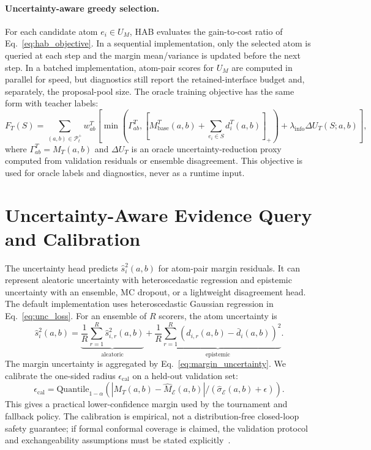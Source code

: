 \documentclass{article}
\newcommand{\E}{\mathcal{E}}
\begin{document}
\paragraph{Uncertainty-aware greedy selection.}
For each candidate atom $e_i\in U_M$, HAB evaluates the gain-to-cost ratio of Eq.~\eqref{eq:hab_objective}. In a sequential implementation, only the selected atom is queried at each step and the margin mean/variance is updated before the next step. In a batched implementation, atom-pair scores for $U_M$ are computed in parallel for speed, but diagnostics still report the retained-interface budget and, separately, the proposal-pool size. The oracle training objective has the same form with teacher labels:
\begin{equation}
F_T(S)=
\sum_{(a,b)\in\mathcal P_t^+}w_{ab}^T
\left[
\min\!\left(\Gamma_{ab}^T,[M_{\mathrm{base}}^T(a,b)+\sum_{e_i\in S}d_i^T(a,b)]_+\right)
+\lambda_{\mathrm{info}}\Delta U_T(S;a,b)
\right],
\end{equation}
where $\Gamma_{ab}^T=M_T(a,b)$ and $\Delta U_T$ is an oracle uncertainty-reduction proxy computed from validation residuals or ensemble disagreement. This objective is used for oracle labels and diagnostics, never as a runtime input.

\section{Uncertainty-Aware Evidence Query and Calibration}
\label{app:uncertainty}

The uncertainty head predicts $\hat s_i^2(a,b)$ for atom-pair margin residuals. It can represent aleatoric uncertainty with heteroscedastic regression and epistemic uncertainty with an ensemble, MC dropout, or a lightweight disagreement head. The default implementation uses heteroscedastic Gaussian regression in Eq.~\eqref{eq:unc_loss}. For an ensemble of $R$ scorers, the atom uncertainty is
\begin{equation}
    \hat s_i^2(a,b)=
    \underbrace{\frac{1}{R}\sum_{r=1}^R \hat s_{i,r}^2(a,b)}_{\mathrm{aleatoric}}
    +
    \underbrace{\frac{1}{R}\sum_{r=1}^R(\hat d_{i,r}(a,b)-\bar d_i(a,b))^2}_{\mathrm{epistemic}}.
\end{equation}
The margin uncertainty is aggregated by Eq.~\eqref{eq:margin_uncertainty}. We calibrate the one-sided radius $\epsilon_{\mathrm{cal}}$ on a held-out validation set:
\begin{equation}
    \epsilon_{\mathrm{cal}}=\text{Quantile}_{1-\alpha}\left(
    \left|M_T(a,b)-\hat M_{\E}(a,b)\right|/\left(\hat\sigma_{\E}(a,b)+\epsilon\right)
    \right).
\end{equation}
This gives a practical lower-confidence margin used by the tournament and fallback policy. The calibration is empirical, not a distribution-free closed-loop safety guarantee; if formal conformal coverage is claimed, the validation protocol and exchangeability assumptions must be stated explicitly~\cite{lindemann2023safe}.
\end{document}
